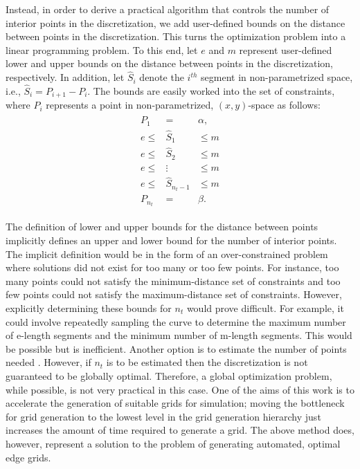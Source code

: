 Instead, in order to derive a practical algorithm that controls the 
number of interior points in the discretization, we add user-defined 
bounds on the distance between points in the discretization.  This turns 
the optimization problem into a linear programming problem.  To this end, 
let $e$ and $m$ represent user-defined lower and upper bounds on the 
distance between points in the discretization, 
respectively.  In addition, let $\hat{S}_i$ denote the $i^{th}$ segment 
in non-parametrized space, i.e., $\hat{S}_i = P_{i+1}-P_i$.  The bounds 
are easily worked into the set of constraints, where $P_i$ represents a 
point in non-parametrized, $(x,y)$-space as follows: 
\begin{eqnarray*} 
\begin{array}{rcl} 
P_1 & = & \alpha,\\ 
e \leq & \hat{S}_1 & \leq m \\ 
e \leq & \hat{S}_2 & \leq m \\ 
e \leq & \vdots & \leq m \\ 
e \leq & \hat{S}_{n_t-1} & \leq m \\ 
P_{n_t} & = & \beta. 
\end{array} 
\end{eqnarray*}

The definition of lower and upper bounds for the distance between points 
implicitly defines an upper and lower bound for the number of interior 
points. The implicit definition would be in the form of an 
over-constrained problem where solutions did not exist for too many or too 
few points. For instance, too many points could not satisfy the 
minimum-distance set of constraints and too few points could not satisfy 
the maximum-distance set of constraints. However, explicitly determining 
these bounds for $n_t$ would prove difficult. For example, it could 
involve repeatedly sampling the curve to determine the maximum number of 
e-length segments and the minimum number of m-length segments. This would 
be possible but is inefficient. Another option is to estimate the number 
of points needed \cite{cuilliere97}. However, if $n_t$ is to be estimated 
then the discretization is not guaranteed to be globally optimal. Therefore, 
a global optimization problem, while possible, is not 
very practical in this case. One of the aims of this work is to 
accelerate the generation of suitable grids for simulation; moving the 
bottleneck for grid generation to the lowest level in the grid generation 
hierarchy just increases the amount of time required to generate a grid. 
The above method does, however, represent a solution to the problem of 
generating automated, optimal edge grids.

